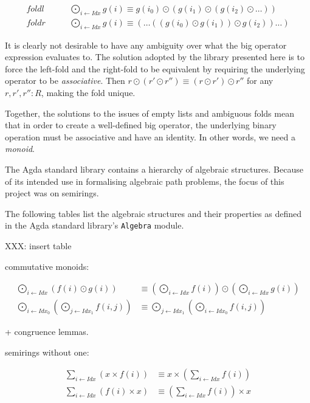 \begin{align*}
	\textit{foldl} &\qquad \bigodot_{i \leftarrow \textit{Idx}} g(i) \equiv g(i_0) \odot (g(i_1) \odot (g(i_2) \odot \ldots )) \\
	\textit{foldr} &\qquad \bigodot_{i \leftarrow \textit{Idx}} g(i) \equiv ( \ldots ((g(i_0) \odot g(i_1)) \odot g(i_2)) \ldots )
\end{align*}

It is clearly not desirable to have any ambiguity over what the big operator expression evaluates to. The solution adopted by the library presented here is to force the left-fold and the right-fold to be equivalent by requiring the underlying operator to be \emph{associative}. Then \(r \odot (r' \odot r'') \equiv (r \odot r') \odot r''\) for any \(r, r', r'' : R\), making the fold unique.

Together, the solutions to the issues of empty lists and ambiguous folds mean that in order to create a well-defined big operator, the underlying binary operation must be associative and have an identity. In other words, we need a \emph{monoid}.


The Agda standard library contains a hierarchy of algebraic structures. Because of its intended use in formalising algebraic path problems, the focus of this project was on semirings.

The following tables list the algebraic structures and their properties as defined in the Agda standard library's \texttt{Algebra} module.

XXX: insert table

commutative monoids:

\begin{align*}
\bigodot_{i \leftarrow \textit{Idx}} \left(f(i) \odot g(i)\right)
&\equiv
\left(\bigodot_{i \leftarrow \textit{Idx}} f(i) \right) \odot \left(\bigodot_{i \leftarrow \textit{Idx}} g(i)\right) \\
\bigodot_{i \leftarrow \textit{Idx}_0} \left(\bigodot_{j \leftarrow \textit{Idx}_1} f(i,j)\right)
&\equiv
\bigodot_{j \leftarrow \textit{Idx}_1} \left(\bigodot_{i \leftarrow \textit{Idx}_0} f(i,j)\right)
\end{align*}

+ congruence lemmas.

semirings without one:

\begin{align*}
\sum_{i \leftarrow \textit{Idx}} \left(x \times f(i)\right)
&\equiv
x \times \left(\sum_{i \leftarrow \textit{Idx}} f(i)\right) \\
\sum_{i \leftarrow \textit{Idx}} \left(f(i) \times x\right)
&\equiv
\left(\sum_{i \leftarrow \textit{Idx}} f(i)\right) \times x \\
\end{align*}


